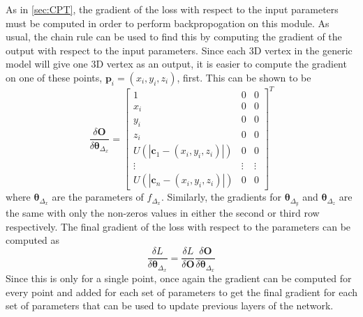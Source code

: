\documentclass[10pt,twocolumn,letterpaper]{article}
\begin{document}
As in \ref{sec:CPT}, the gradient of the loss with respect to the input parameters must be computed in order to perform backpropogation on this module. As usual, the chain rule can be used to find this by computing the gradient of the output with respect to the input parameters. Since each 3D vertex in the generic model will give one 3D vertex as an output, it is easier to compute the gradient on one of these points, $\mathbf{p}_i=(x_i,y_i,z_i)$, first. This can be shown to be
\begin{equation}
\frac{\delta\mathbf{O}}{\delta \boldsymbol{\theta}_{\Delta_x}}=\begin{bmatrix}1&0&0\\x_i&0&0\\y_i&0&0\\z_i&0&0\\U\left(|\mathbf{c}_1-\left(x_i,y_i,z_i\right)|\right)&0&0\\\vdots&\vdots&\vdots\\U\left(|\mathbf{c}_n-\left(x_i,y_i,z_i\right)|\right)&0&0\end{bmatrix}^T
\end{equation}
where $\boldsymbol{\theta}_{\Delta_x}$ are the parameters of $f_{\Delta_x}$. Similarly, the gradients for $\boldsymbol{\theta}_{\Delta_y}$ and $\boldsymbol{\theta}_{\Delta_z}$ are the same with only the non-zeros values in either the second or third row respectively. The final gradient of the loss with respect to the parameters can be computed as
\begin{equation}
\frac{\delta L}{\delta\boldsymbol{\theta}_{\Delta_x}}=\frac{\delta L}{\delta \mathbf{O}}\frac{\delta \mathbf{O}}{\delta \boldsymbol{\theta}_{\Delta_x}}
\end{equation}
Since this is only for a single point, once again the gradient can be computed for every point and added for each set of parameters to get the final gradient for each set of parameters that can be used to update previous layers of the network.
\end{document}
